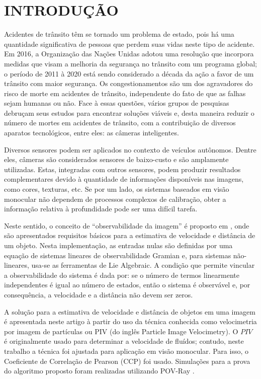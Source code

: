 \section{INTRODUÇÃO}

Acidentes de trânsito têm se tornado um problema de estado, pois há uma quantidade significativa de pessoas que
perdem suas vidas neste tipo de acidente. Em 2016, a Organização das Nações Unidas adotou uma 
resolução que incorpora medidas que visam 
a melhoria da segurança no trânsito com um programa global; 
o período de 2011 à 2020 está sendo considerado a década da ação a favor
de um trânsito com maior segurança.
Os congestionamentos são um dos agravadores do risco de morte em acidentes de trânsito, 
independente do fato de que as falhas sejam humanas ou não. 
Face à essas questões, vários grupos de pesquisas debruçam seus estudos 
para encontrar soluções viáveis e, desta maneira
reduzir o número de mortes em acidentes de trânsito, com a 
contribuição de diversos aparatos tecnológicos, entre eles: as câmeras inteligentes.


Diversos sensores podem ser aplicados no contexto de veículos autônomos. Dentre eles, 
câmeras são considerados sensores de baixo-custo e são amplamente utilizadas. 
Estas, integradas com outros sensores, podem produzir resultados complementares devido à 
quantidade de informações disponíveis nas imagens, como cores, texturas, etc. 
Se por um lado, os sistemas baseados em visão monocular não dependem de processos 
complexos de calibração, obter a informação relativa à profundidade pode ser uma difícil 
tarefa.


Neste sentido, o conceito de ``observabilidade da imagem'' é 
proposto em \cite{Breugel}, onde são apresentados requisitos 
básicos para a estimativa de velocidade e 
distância de um objeto. Nesta implementação, as entradas nulas 
são definidas por uma equação de sistemas lineares de observabilidade Gramian e,
para sistemas não-lineares, usa-se as ferramentas de Lie Algebraic. 
A condição que permite vincular a observabilidade do sistema é dada por:
se o número de termos linearmente independentes é igual ao número de estados, 
então o sistema é observável e, por consequência, a velocidade e a 
distância não devem ser zeros.

A solução para a estimativa de velocidade e distância de objetos em uma imagem é 
apresentada neste artigo à partir do uso da técnica 
conhecida como velocimetria por imagem de partículas ou PIV 
(do inglês Particle Image Velocimetry). 
O $PIV$ é originalmente usado para determinar a velocidade de fluídos; contudo, neste trabalho
a técnica foi ajustada para aplicação em visão monocular. Para isso, o Coeficiente de 
Correlação de Pearson (CCP) \cite{Miranda Neto} foi usado. Simulações 
para a prova do algoritmo proposto foram realizadas utilizando POV-Ray \cite{povray}.




















